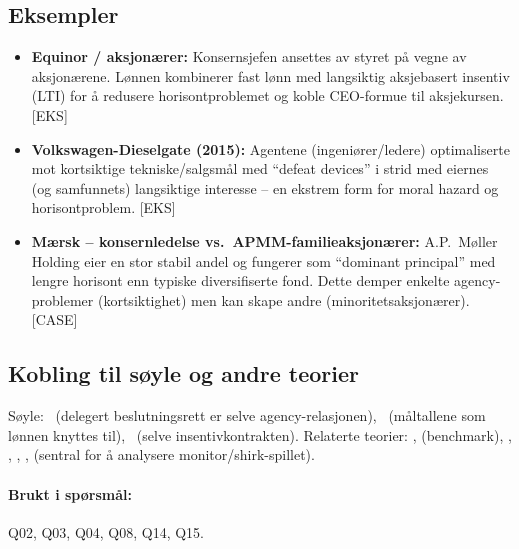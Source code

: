 \subsection*{Eksempler}
\begin{itemize}
\item \textbf{Equinor / aksjonærer:} Konsernsjefen ansettes av styret på vegne av aksjonærene. Lønnen kombinerer fast lønn med langsiktig aksjebasert insentiv (LTI) for å redusere horisontproblemet og koble CEO-formue til aksjekursen. [EKS]
\item \textbf{Volkswagen-Diesel\-gate (2015):} Agentene (ingeniører/ledere) optimaliserte mot kortsiktige tekniske/salgsmål med ``defeat devices'' i strid med eiernes (og samfunnets) langsiktige interesse -- en ekstrem form for moral hazard og horisontproblem. [EKS]
\item \textbf{Mærsk -- konsernledelse vs.\ APMM-familieaksjonærer:} A.P.\ Møller Holding eier en stor stabil andel og fungerer som ``dominant principal'' med lengre horisont enn typiske diversifiserte fond. Dette demper enkelte agency-problemer (kortsiktighet) men kan skape andre (minoritetsaksjonærer). [CASE]
\end{itemize}

\subsection*{Kobling til søyle og andre teorier}
Søyle: \SOne\ (delegert beslutningsrett er selve agency-relasjonen), \STwo\ (måltallene som lønnen knyttes til), \SThree\ (selve insentivkontrakten). Relaterte teorier: ,  (benchmark), , , , ,  (sentral for å analysere monitor/shirk-spillet).

\paragraph{Brukt i spørsmål:} Q02, Q03, Q04, Q08, Q14, Q15.
